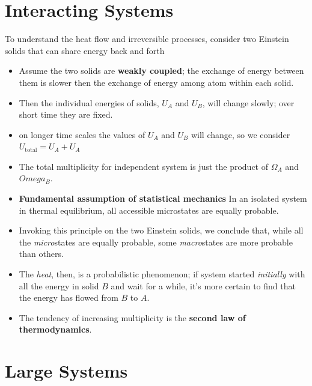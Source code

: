 \documentclass{book}
\begin{document}
\section{Interacting Systems}%
\label{sec:Interacting Systems}

To understand the heat flow and irreversible processes, consider two Einstein solids that can
share energy back and forth

\begin{itemize}
	\item Assume the two solids are \textbf{weakly coupled}; the exchange of energy between them
	      is slower then the exchange of energy among atom within each solid.
	\item Then the individual energies of solids, $U_A$ and $U_B$, will change slowly;
	      over short time they are fixed.
	\item on longer time scales the values of $U_A$ and $U_B$ will change, so we consider
	      $U_\text{total} = U_A + U_A$
	\item The total multiplicity for independent system is just the product of $\Omega_A$ and $Omega_B$.
	\item \textbf{Fundamental assumption of statistical mechanics} In an isolated system
	      in thermal equilibrium, all accessible microstates are equally probable.
	\item Invoking this principle on the two Einstein solids, we conclude that, while all the
	      \textit{micro}states are equally probable, some \textit{macro}states are more probable than others.
	\item The \textit{heat}, then, is a probabilistic phenomenon; if system started \textit{initially}
	      with all the energy in solid $B$ and wait for a while, it's more certain to find that the
	      energy has flowed from $B$ to $A$.
	\item The tendency of increasing multiplicity is the \textbf{second law of thermodynamics}.
\end{itemize}


\section{Large Systems}%
\label{sec:large systems}
\end{document}

